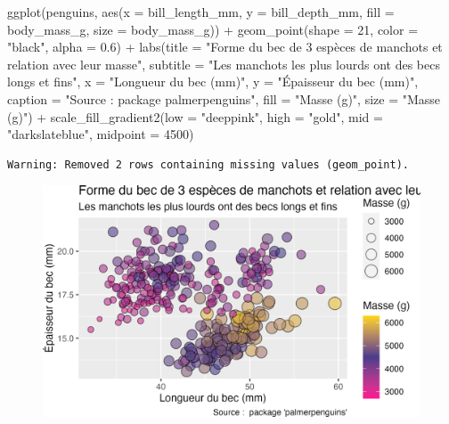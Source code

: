 \documentclass[
  letterpaper,
  DIV=11,
  numbers=noendperiod]{scrreprt}
\newenvironment{Shaded}{\begin{snugshade}}{\end{snugshade}}
\newcommand{\AttributeTok}[1]{\textcolor[rgb]{0.40,0.45,0.13}{#1}}
\newcommand{\DecValTok}[1]{\textcolor[rgb]{0.68,0.00,0.00}{#1}}
\newcommand{\FloatTok}[1]{\textcolor[rgb]{0.68,0.00,0.00}{#1}}
\newcommand{\FunctionTok}[1]{\textcolor[rgb]{0.28,0.35,0.67}{#1}}
\newcommand{\NormalTok}[1]{\textcolor[rgb]{0.00,0.23,0.31}{#1}}
\newcommand{\SpecialCharTok}[1]{\textcolor[rgb]{0.37,0.37,0.37}{#1}}
\newcommand{\StringTok}[1]{\textcolor[rgb]{0.13,0.47,0.30}{#1}}
\begin{document}
\begin{Shaded}
\begin{Highlighting}[]
\FunctionTok{ggplot}\NormalTok{(penguins, }\FunctionTok{aes}\NormalTok{(}\AttributeTok{x =}\NormalTok{ bill\_length\_mm, }\AttributeTok{y =}\NormalTok{ bill\_depth\_mm,}
                     \AttributeTok{fill =}\NormalTok{ body\_mass\_g, }\AttributeTok{size =}\NormalTok{ body\_mass\_g)) }\SpecialCharTok{+}
  \FunctionTok{geom\_point}\NormalTok{(}\AttributeTok{shape =} \DecValTok{21}\NormalTok{, }\AttributeTok{color =} \StringTok{"black"}\NormalTok{, }\AttributeTok{alpha =} \FloatTok{0.6}\NormalTok{) }\SpecialCharTok{+}
  \FunctionTok{labs}\NormalTok{(}\AttributeTok{title =} \StringTok{"Forme du bec de 3 espèces de manchots et relation avec leur masse"}\NormalTok{,}
       \AttributeTok{subtitle =} \StringTok{"Les manchots les plus lourds ont des becs longs et fins"}\NormalTok{,}
       \AttributeTok{x =} \StringTok{"Longueur du bec (mm)"}\NormalTok{,}
       \AttributeTok{y =} \StringTok{"Épaisseur du bec (mm)"}\NormalTok{,}
       \AttributeTok{caption =} \StringTok{"Source :  package \textquotesingle{}palmerpenguins\textquotesingle{}"}\NormalTok{,}
       \AttributeTok{fill =} \StringTok{"Masse (g)"}\NormalTok{,}
       \AttributeTok{size =} \StringTok{"Masse (g)"}\NormalTok{) }\SpecialCharTok{+}
  \FunctionTok{scale\_fill\_gradient2}\NormalTok{(}\AttributeTok{low =} \StringTok{"deeppink"}\NormalTok{, }\AttributeTok{high =} \StringTok{"gold"}\NormalTok{, }\AttributeTok{mid =} \StringTok{"darkslateblue"}\NormalTok{,}
                       \AttributeTok{midpoint =} \DecValTok{4500}\NormalTok{)}
\end{Highlighting}
\end{Shaded}

\begin{verbatim}
Warning: Removed 2 rows containing missing values (geom_point).
\end{verbatim}

\begin{figure}[H]

{\centering \includegraphics{./03-visualization_files/figure-pdf/unnamed-chunk-97-1.png}

}

\end{figure}
\end{document}
